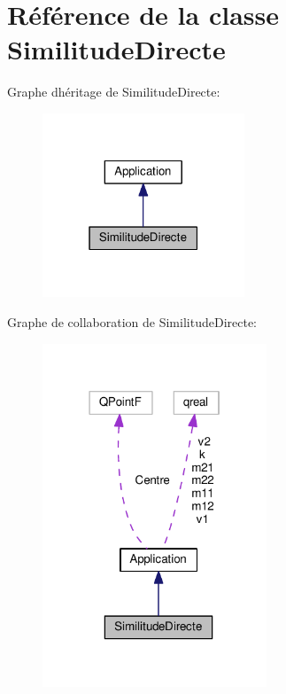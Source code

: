 \hypertarget{class_similitude_directe}{}\section{Référence de la classe Similitude\+Directe}
\label{class_similitude_directe}


Graphe d\textquotesingle{}héritage de Similitude\+Directe\+:\nopagebreak
\begin{figure}[H]
\begin{center}
\leavevmode
\includegraphics[width=171pt]{class_similitude_directe__inherit__graph}
\end{center}
\end{figure}


Graphe de collaboration de Similitude\+Directe\+:\nopagebreak
\begin{figure}[H]
\begin{center}
\leavevmode
\includegraphics[width=190pt]{class_similitude_directe__coll__graph}
\end{center}
\end{figure}

